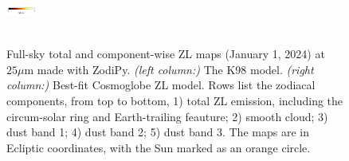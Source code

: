 \documentclass[twocolumn]{aa}
\begin{document}
\begin{figure}
{    \includegraphics[width=1cm,angle=90]{figs/comp_maps/cbar_2_inst.pdf}%
    }\\
    \\
    \caption{Full-sky total and component-wise ZL maps (January 1, 2024) at $25\mu$m made with ZodiPy. 
    \textit{(left column:)} The K98 model. \textit{(right column:)} Best-fit Cosmoglobe ZL model. 
    Rows list the zodiacal components, from top to bottom, 1) total ZL emission, including the 
    circum-solar ring and Earth-trailing feauture; 2) smooth cloud; 3) dust band 1; 4) 
    dust band 2; 5) dust band 3. The maps are in Ecliptic coordinates, with the Sun marked as 
    an orange circle.}
    \label{fig:mission-averaged-inst-maps}
\end{figure}
\end{document}
